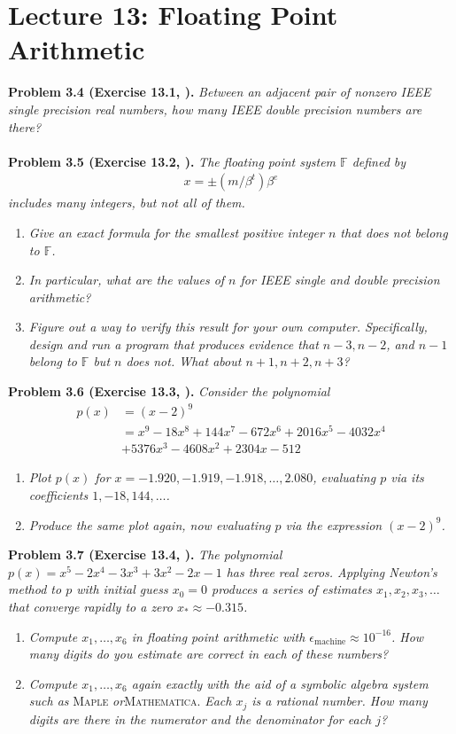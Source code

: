 \documentclass[a4paper,oneside]{book}
\numberwithin{equation}{chapter}
\begin{document}
\section{Lecture 13: Floating Point Arithmetic}
\textbf{Problem 3.4 (Exercise 13.1, \cite{1}).} \textit{Between an adjacent pair of nonzero IEEE single precision real numbers, how many IEEE double precision numbers are there?}\\
\\
\textbf{Problem 3.5 (Exercise 13.2, \cite{1}).} \textit{The floating point system $\mathbb{F}$ defined by}
\begin{align}
x =  \pm \left( {m/{\beta ^t}} \right){\beta ^e}
\end{align}
\textit{includes many integers, but not all of them.}
\begin{enumerate}
\item \textit{Give an exact formula for the smallest positive integer $n$ that does not belong to $\mathbb{F}$.}
\item \textit{In particular, what are the values of $n$ for IEEE single and double precision arithmetic?}
\item \textit{Figure out a way to verify this result for your own computer. Specifically, design and run a program that produces evidence that $n-3,n-2$, and $n-1$ belong to $\mathbb{F}$ but $n$ does not. What about $n+1,n+2,n+3$?}
\end{enumerate}
\textbf{Problem 3.6 (Exercise 13.3, \cite{1}).} \textit{Consider the polynomial}
\begin{align}
p\left( x \right)& = {\left( {x - 2} \right)^9}\\
& = {x^9} - 18{x^8} + 144{x^7} - 672{x^6} + 2016{x^5} - 4032{x^4}\\
& + 5376{x^3} - 4608{x^2} + 2304x - 512
\end{align}
\begin{enumerate}
\item \textit{Plot $p\left(x\right)$ for $x=-1.920,-1.919,-1.918,\ldots,2.080$, evaluating $p$ via its coefficients $1,-18,144,\ldots$.}
\item \textit{Produce the same plot again, now evaluating $p$ via the expression $\left(x-2\right)^9$.}
\end{enumerate}
\textbf{Problem 3.7 (Exercise 13.4, \cite{1}).} \textit{The polynomial $p\left(x\right)=x^5-2x^4-3x^3+3x^2-2x-1$ has three real zeros. Applying Newton's method to $p$ with initial guess $x_0=0$ produces a series of estimates $x_1,x_2,x_3,\ldots$ that converge rapidly to a zero $x_* \approx -0.315$.}
\begin{enumerate}
\item \textit{Compute $x_1,\ldots,x_6$ in floating point arithmetic with $\epsilon _{\mbox{machine}}\approx 10^{-16}$. How many digits do you estimate are correct in each of these numbers?}
\item \textit{Compute $x_1,\ldots,x_6$ again exactly with the aid of a symbolic algebra system such as}\textsc{ Maple}\textit{ or}\textsc{Mathematica}.\textit{ Each $x_j$ is a rational number. How many digits are there in the numerator and the denominator for each $j$?}
\end{enumerate}
\end{document}
